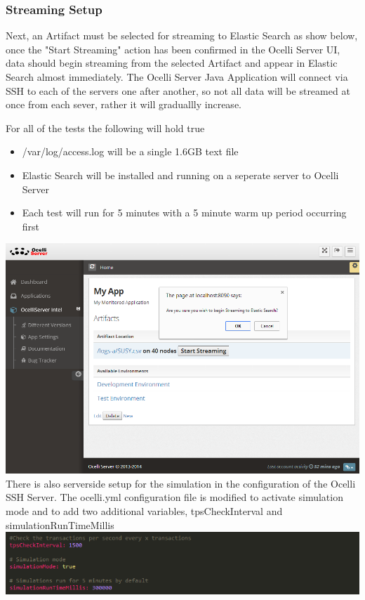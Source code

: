 \documentclass{llncs}
\begin{document}
\subsubsection{Streaming Setup}
Next, an Artifact must be selected for streaming to Elastic Search as show below, once the "Start Streaming" action has been confirmed in the Ocelli Server UI, data should begin streaming from the selected Artifact and appear in Elastic Search almost immediately. The Ocelli Server Java Application will connect via SSH to each of the servers one after another, so not all data will be streamed at once from each sever, rather it will graduallly increase.\newline\newline

For all of the tests the following will hold true

\begin{itemize}
\item /var/log/access.log will be a single 1.6GB text file
\item Elastic Search will be installed and running on a seperate server to Ocelli Server
\item Each test will run for 5 minutes with a 5 minute warm up period occurring first
\end{itemize}

\includegraphics[scale=0.55]{app2}\newline\newline
There is also serverside setup for the simulation in the configuration of the Ocelli SSH Server. The ocelli.yml configuration file is modified to activate simulation mode and to add two additional variables, tpsCheckInterval and simulationRunTimeMillis\newline\newline
\includegraphics[scale=0.75]{app3}\newline\newline
\end{document}
